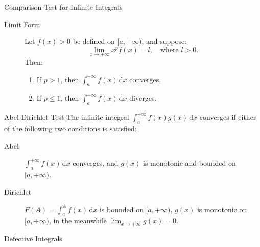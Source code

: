 \documentclass[11pt]{../../TexTemplate/elegantbook}
\begin{document}
\begin{theorem}{Comparison Test for Infinite Integrals}
\begin{description}
    \item[Limit Form] Let \( f(x) > 0 \) be defined on \( [a, +\infty) \), and suppose:
    \[
    \lim_{x \to +\infty} x^p f(x) = l, \quad \text{where } l > 0.
    \]
    Then:
    \begin{enumerate}[label=\roman*)]
        \item If \( p > 1 \), then \( \int_{a}^{+\infty} f(x) \, \mathrm{d}x \) converges.
        \item If \( p \leq 1 \), then \( \int_{a}^{+\infty} f(x) \, \mathrm{d}x \) diverges.
    \end{enumerate}
\end{description}
\end{theorem}

\begin{theorem}{Abel-Dirichlet Test}
    The infinite integral \( \int_{a}^{+\infty} f(x)g(x) \, \mathrm{d}x \) converges 
    if either of the following two conditions is satisfied:
    \begin{description}
        \item [Abel] \( \int_{a}^{+\infty} f(x) \, \mathrm{d}x \) converges, 
            and \( g(x) \) is monotonic and bounded on \( [a, +\infty) \).
        \item [Dirichlet] \( F(A) = \int_{a}^{A} f(x) \, \mathrm{d}x \) is bounded on \( [a, +\infty) \), 
            \( g(x) \) is monotonic on \( [a, +\infty) \), in the meanwhile \( \lim_{x \to +\infty} g(x) = 0 \).
    \end{description}
\end{theorem}


\begin{leftbarTitle}{Defective Integrals}\end{leftbarTitle}
\end{document}
